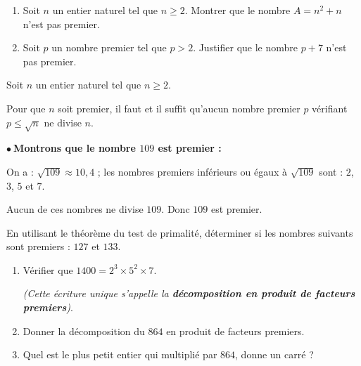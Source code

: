 \documentclass[10pt, a4paper]{article}
\begin{document}
\begin{Application}[][15 min]
\begin{enumerate}[leftmargin=*,itemsep=0.5pt]
    \item Soit $n$ un entier naturel tel que $n \ge 2$.
          Montrer que le nombre $A = n^2 + n$ n'est pas premier.

    \item Soit $p$ un nombre premier tel que $p > 2$. Justifier que le nombre $p + 7$ n'est pas premier.
\end{enumerate}
\end{Application}

\begin{Theoreme} Soit $n$ un entier naturel tel que $n \geq 2$.

Pour que $n$ soit premier, il faut et il suffit qu'aucun nombre premier $p$ vérifiant $p \leq \sqrt{n}$ ne divise $n$.
\end{Theoreme}

\begin{Exemple}[][5 min]
$\bullet~$\textbf{Montrons que le nombre $109$ est premier :}

On a : $\sqrt{109} \approx 10,4$ ;
les nombres premiers inférieurs ou égaux à $\sqrt{109}$ sont : $2$, $3$, $5$ et $7$.

Aucun de ces nombres ne divise $109$. Donc $109$ est premier.
\end{Exemple}


\begin{Application}[][15 min]
  En utilisant le théorème du test de primalité, déterminer si les nombres suivants sont premiers : $127$ et $133$.

\end{Application}

\begin{Activite}[][10 min]
\begin{enumerate}[leftmargin=*,itemsep=0.5pt]
   \item Vérifier que $1400 = 2^3 \times 5^2 \times 7 $.

   \textit{(Cette écriture unique s'appelle la \textbf{décomposition en produit de facteurs premiers})}.
    \item Donner la décomposition du $864$ en produit de facteurs premiers.
    \item Quel est le plus petit entier qui multiplié par $864$, donne un carré ?
\end{enumerate}
\end{Activite}
\end{document}
